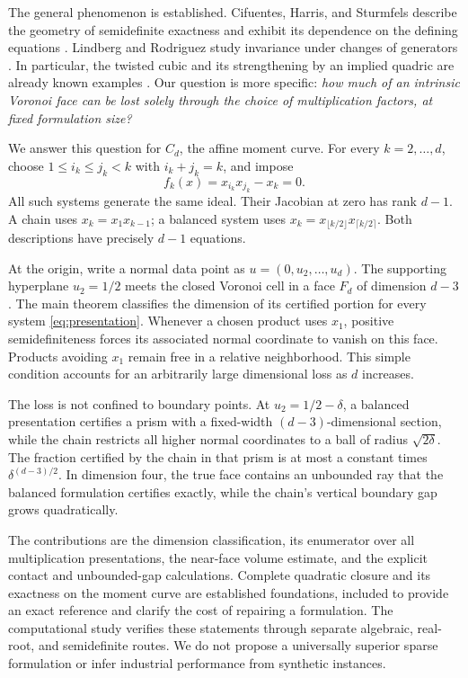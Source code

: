\documentclass[11pt]{article}
\theoremstyle{definition}\newtheorem{definition}[theorem]{Definition}
\theoremstyle{remark}\newtheorem{remark}[theorem]{Remark}
\begin{document}
The general phenomenon is established. Cifuentes, Harris, and Sturmfels describe the geometry of semidefinite exactness and exhibit its dependence on the defining equations \cite{chs}. Lindberg and Rodriguez study invariance under changes of generators \cite{lr}. In particular, the twisted cubic and its strengthening by an implied quadric are already known examples \cite[Examples 6.1--6.2]{chs}. Our question is more specific: \emph{how much of an intrinsic Voronoi face can be lost solely through the choice of multiplication factors, at fixed formulation size?}

We answer this question for $C_d$, the affine moment curve. For every $k=2,\ldots,d$, choose $1\le i_k\le j_k<k$ with $i_k+j_k=k$, and impose
\begin{equation}\label{eq:presentation}
 f_k(x)=x_{i_k}x_{j_k}-x_k=0.
\end{equation}
All such systems generate the same ideal. Their Jacobian at zero has rank $d-1$. A chain uses $x_k=x_1x_{k-1}$; a balanced system uses $x_k=x_{\lfloor k/2\rfloor}x_{\lceil k/2\rceil}$. Both descriptions have precisely $d-1$ equations.

At the origin, write a normal data point as $u=(0,u_2,\ldots,u_d)$. The supporting hyperplane $u_2=1/2$ meets the closed Voronoi cell in a face $F_d$ of dimension $d-3$. The main theorem classifies the dimension of its certified portion for every system \eqref{eq:presentation}. Whenever a chosen product uses $x_1$, positive semidefiniteness forces its associated normal coordinate to vanish on this face. Products avoiding $x_1$ remain free in a relative neighborhood. This simple condition accounts for an arbitrarily large dimensional loss as $d$ increases.

The loss is not confined to boundary points. At $u_2=1/2-\delta$, a balanced presentation certifies a prism with a fixed-width $(d-3)$-dimensional section, while the chain restricts all higher normal coordinates to a ball of radius $\sqrt{2\delta}$. The fraction certified by the chain in that prism is at most a constant times $\delta^{(d-3)/2}$. In dimension four, the true face contains an unbounded ray that the balanced formulation certifies exactly, while the chain's vertical boundary gap grows quadratically.

The contributions are the dimension classification, its enumerator over all multiplication presentations, the near-face volume estimate, and the explicit contact and unbounded-gap calculations. Complete quadratic closure and its exactness on the moment curve are established foundations, included to provide an exact reference and clarify the cost of repairing a formulation. The computational study verifies these statements through separate algebraic, real-root, and semidefinite routes. We do not propose a universally superior sparse formulation or infer industrial performance from synthetic instances.
\end{document}
